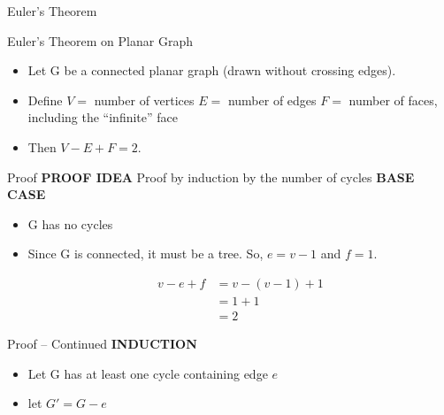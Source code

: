 \begin{section}{Euler’s Theorem}
    
    \begin{frame}{Euler’s Theorem on Planar Graph}
    \begin{itemize}
        \item Let G be a connected planar graph (drawn without crossing edges).
        \pause
        \item Define \newline $V = $ number of vertices
            \newline $E = $ number of edges
            \newline $F = $ number of faces, including the “infinite” face
        \pause
        \item Then $V - E + F = 2.$
    \end{itemize}
    
    \end{frame}
    
    \begin{frame}{Proof}
    \textbf{PROOF IDEA} \newline
    Proof by induction by the number of cycles \newline \newline
    \textbf{BASE CASE}
    \begin{itemize}
        \item G has no cycles \pause
        \item Since G is connected, it must be a tree. So, $e = v-1$ and $f = 1$.
        
        \begin{align*} 
v-e+f  &= v-(v-1)+1 \\ 
        &=  1 +1\\
        & = 2
\end{align*}
    \end{itemize}

    \end{frame}
    
    \begin{frame}{Proof -- Continued}
    \textbf{INDUCTION} 
    \begin{itemize}
        \item Let G has at least one cycle containing edge $e$ \pause
        \item let $G' = G - e$ \pause
    
        \begin{columns}
\begin{center}
\end{center}
\end{columns}
\end{itemize}
\end{frame}
\end{section}
